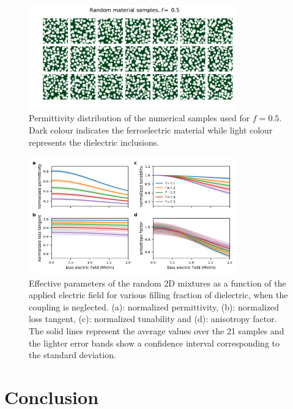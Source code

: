 \documentclass[%
 aip,
 amsmath,amssymb,
 reprint,%
]{revtex4-1}
\begin{document}
%
\begin{figure}[h!]
 \centering
 \includegraphics[width=0.8\textwidth]{random_samples_f_50percent}
 \caption{Permittivity distribution of the numerical samples used for $f=0.5$. Dark
  colour indicates the ferroelectric material while light colour represents the
  dielectric inclusions.}
 \label{randmatepsi}
\end{figure}


\begin{figure}[h!]
 \centering
 \includegraphics[width=0.8\textwidth]{effpar_rand_uncpl.png}
 \caption{Effective parameters of the random 2D mixtures as a function of the
  applied electric field for various filling fraction of dielectric, when the
  coupling is neglected.
  (a): normalized permittivity, (b): normalized loss tangent, (c): normalized tunability and
  (d): anisotropy factor. The solid lines represent the average values
  over the 21 samples and the lighter error bands show a confidence interval corresponding to
  the standard deviation.}
 \label{eff_par_2Drand_TM_uncpl}
\end{figure}
%
\section{Conclusion}
\end{document}
